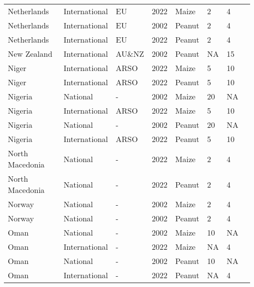 \begin{landscape}
\begin{longtable}[c]{llllllll}
Netherlands       & International & EU       & 2022 & Maize  & 2  & 4  & \citet{EC2010}               \\
Netherlands       & International & EU       & 2002 & Peanut & 2  & 4  & \citet{EC2010}               \\
Netherlands       & International & EU       & 2022 & Peanut & 2  & 4  & \citet{EC2010}               \\
New Zealand       & International & AU\&NZ    & 2002 & Peanut & NA & 15 & \citet{FSANZ2022}            \\
Niger             & International & ARSO     & 2022 & Maize  & 5  & 10 & \citet{ARSO2022}             \\
Niger             & International & ARSO     & 2022 & Peanut & 5  & 10 & \citet{ARSO2022}             \\
Nigeria           & National      & -        & 2002 & Maize  & 20 & NA & \citet{van2004worldwide}     \\
Nigeria           & International & ARSO     & 2022 & Maize  & 5  & 10 & \citet{ARSO2022}             \\
Nigeria           & National      & -        & 2002 & Peanut & 20 & NA & \citet{van2004worldwide}     \\
Nigeria           & International & ARSO     & 2022 & Peanut & 5  & 10 & \citet{ARSO2022}             \\
North Macedonia   & National      & -        & 2022 & Maize  & 2  & 4  & \citet{AHV2013}              \\
North Macedonia   & National      & -        & 2022 & Peanut & 2  & 4  & \citet{AHV2013}              \\
Norway            & National      & -        & 2002 & Maize  & 2  & 4  & \citet{van2004worldwide}     \\
Norway            & National      & -        & 2002 & Peanut & 2  & 4  & \citet{van2004worldwide}     \\
Oman              & National      & -        & 2002 & Maize  & 10 & NA & \citet{van2004worldwide}     \\
Oman              & International & -        & 2022 & Maize  & NA & 4  & \citet{van2004worldwide}     \\
Oman              & National      & -        & 2002 & Peanut & 10 & NA & \citet{van2004worldwide}     \\
Oman              & International & -        & 2022 & Peanut & NA & 4  & \citet{van2004worldwide}     \\

\end{longtable}
\end{landscape}
